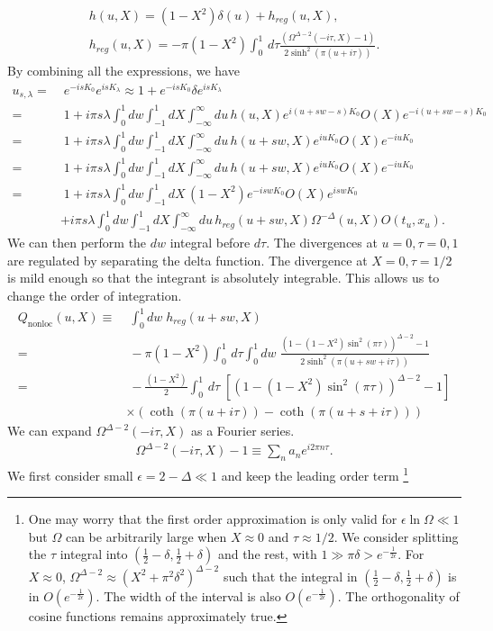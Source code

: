 \documentclass[a4paper,11pt]{article}
\theoremstyle{definition}
\begin{document}
\begin{gather}
    h(u,X) =  (1-X^2)\delta(u) + h_{reg}(u,X), \\
    h_{reg}(u,X)= -\pi(1-X^2)\int_0^1\, d\tau \frac{ (\Omega^{\Delta-2}(-i\tau,X) -1)}{2\sinh^2(\pi (u+i\tau))} .
\end{gather}
By combining all the expressions, we have
\begin{align}
    u_{s,\lambda} =&\; e^{-isK_0}e^{isK_\lambda} \approx 1 + e^{-isK_0}\delta e^{isK_\lambda}\\
    =&\; 1 + i\pi s\lambda\int_0^1 dw  \int_{-1}^1 dX \int_{-\infty}^{\infty} du \, h(u,X) e^{i(u+sw-s)K_0} O(X) e^{-i(u+sw-s)K_0} \\
    =&\; 1 + i\pi s\lambda\int_0^1 dw  \int_{-1}^1 dX \int_{-\infty}^{\infty} du \, h(u+sw,X) e^{iuK_0} O(X) e^{-iuK_0} \\
    =&\; 1 + i\pi s\lambda\int_0^1 dw  \int_{-1}^1 dX \int_{-\infty}^{\infty} du \, h(u+sw,X) e^{iuK_0} O(X) e^{-iuK_0}\\
    =&\; 1 + i\pi s\lambda\int_0^1 dw  \int_{-1}^1 dX \, (1-X^2)e^{-iswK_0} O(X) e^{iswK_0} \nonumber\\
    &+ {i\pi s\lambda}\int_0^1 dw  \int_{-1}^1 dX \int_{-\infty}^{\infty} du \, h_{reg}(u+sw,X) \Omega^{-\Delta}(u,X)O(t_u,x_u).
\end{align}
We can then perform the $dw$ integral before $d\tau$. The divergences at $u = 0, \tau = 0, 1$ are regulated by separating the delta function. The divergence at $X=0, \tau = 1/2$ is mild enough so that the integrant is absolutely integrable. This allows us to change the order of integration.
\begin{align}
    Q_{\text{nonloc}}(u,X) \equiv&\;\int_0^1 dw \; h_{reg}(u+sw,X) \nonumber\\
    =&\; -\pi(1-X^2)\int_0^1 \, d\tau \int_0^1 dw \;\frac{\left(1 - (1-X^2)\sin^2(\pi \tau)\right)^{\Delta-2} -1}{2\sinh^2(\pi (u+sw+i\tau))}\\
    =&\; -\frac{(1-X^2)}{2}\int_0^1 \, d\tau \; \left[\left(1 - (1-X^2)\sin^2(\pi \tau)\right)^{\Delta-2} -1\right] \nonumber\\
    &\times\left( \coth(\pi(u+i\tau)) - \coth(\pi(u+s+i\tau)) \right)
\end{align}
We can expand $\Omega^{\Delta-2}(-i\tau,X)$ as a Fourier series.
\begin{align}
    \Omega^{\Delta-2}(-i\tau,X) - 1 \equiv \sum_{n} a_n e^{i2\pi n \tau}.
\end{align}
We first consider small $\epsilon =2-\Delta\ll 1$ and keep the leading order term \footnote{One may worry that the first order approximation is only valid for $\epsilon \ln\Omega \ll 1$ but $\Omega$ can be arbitrarily large when $X\approx 0$ and $\tau \approx 1/2$. We consider splitting the $\tau$ integral into $(\frac{1}{2}-\delta, \frac{1}{2}+\delta)$ and the rest, with $1 \gg \pi\delta > e^{-\frac{1}{2\epsilon}}$. For $X\approx0$, $\Omega^{\Delta-2} \approx (X^2+\pi^2\delta^2)^{\Delta-2}$ such that the integral in $(\frac{1}{2}-\delta, \frac{1}{2}+\delta)$ is in $O(e^{-\frac{1}{2\epsilon}})$. The width of the interval is also $O(e^{-\frac{1}{2\epsilon}})$. The orthogonality of cosine functions remains approximately true.}
\end{document}
